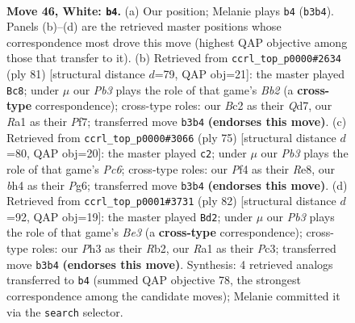 \documentclass[11pt]{article}
\begin{document}
\clearpage

\begin{figure}[p]\centering
\begin{subfigure}{0.46\textwidth}\centering
\resizebox{\linewidth}{!}{%
\newchessgame
\chessboard[
  setfen={r1b3k1/p1p2pp1/qp3n2/7p/5P1b/BP2Q2P/P1B3PK/R7 w - - 4 46},
  showmover=false,
  pgfstyle=straightmove, color=movearrow, markmove={b3-b4}
]}
\caption{}
\end{subfigure}\hfill
\begin{subfigure}{0.46\textwidth}\centering
\resizebox{\linewidth}{!}{%
\newchessgame
\chessboard[
  setfen={6k1/1b1q1p2/p2b2p1/P2p3p/1p6/1N1BP1P1/1PQ2PP1/6K1 b - - 19 41},
  showmover=false,
  pgfstyle=straightmove, color=movearrow, markmove={b7-c8}
]}
\caption{}
\end{subfigure}
\\[4pt]
\begin{subfigure}{0.46\textwidth}\centering
\resizebox{\linewidth}{!}{%
\newchessgame
\chessboard[
  setfen={4r1k1/2q2p1p/3p2pB/3Pb3/1R2P3/P1p1Q2P/1n2NPP1/6K1 b - - 3 38},
  showmover=false,
  pgfstyle=straightmove, color=movearrow, markmove={c3-c2}
]}
\caption{}
\end{subfigure}\hfill
\begin{subfigure}{0.46\textwidth}\centering
\resizebox{\linewidth}{!}{%
\newchessgame
\chessboard[
  setfen={3r2k1/p2q1pp1/6np/P2p1b1Q/2pP3P/2P1B1P1/1R3P1K/3B4 w - - 9 42},
  showmover=false,
  pgfstyle=straightmove, color=movearrow, markmove={e3-d2}
]}
\caption{}
\end{subfigure}
\caption{\textbf{Move 46, White: \texttt{b4}.} (a) Our position; Melanie plays \texttt{b4} (\texttt{b3b4}). Panels (b)--(d) are the retrieved master positions whose correspondence most drove this move (highest QAP objective among those that transfer to it). (b) Retrieved from \texttt{ccrl\_top\_p0000\#2634} (ply 81) [structural distance $d$=79, QAP obj=21]: the master played \texttt{Bc8}; under $\mu$ our \emph{Pb3} plays the role of that game's \emph{Bb2} (a \textbf{cross-type} correspondence); cross-type roles: our \emph{B}c2 as their \emph{Q}d7, our \emph{R}a1 as their \emph{P}f7; transferred move \texttt{b3b4} \textbf{(endorses this move)}. (c) Retrieved from \texttt{ccrl\_top\_p0000\#3066} (ply 75) [structural distance $d$=80, QAP obj=20]: the master played \texttt{c2}; under $\mu$ our \emph{Pb3} plays the role of that game's \emph{Pc6}; cross-type roles: our \emph{P}f4 as their \emph{R}e8, our \emph{b}h4 as their \emph{P}g6; transferred move \texttt{b3b4} \textbf{(endorses this move)}. (d) Retrieved from \texttt{ccrl\_top\_p0001\#3731} (ply 82) [structural distance $d$=92, QAP obj=19]: the master played \texttt{Bd2}; under $\mu$ our \emph{Pb3} plays the role of that game's \emph{Be3} (a \textbf{cross-type} correspondence); cross-type roles: our \emph{P}h3 as their \emph{R}b2, our \emph{R}a1 as their \emph{P}c3; transferred move \texttt{b3b4} \textbf{(endorses this move)}. Synthesis: 4 retrieved analogs transferred to \texttt{b4} (summed QAP objective 78, the strongest correspondence among the candidate moves); Melanie committed it via the \texttt{search} selector.}
\label{fig:thought-m90}
\end{figure}
\end{document}
